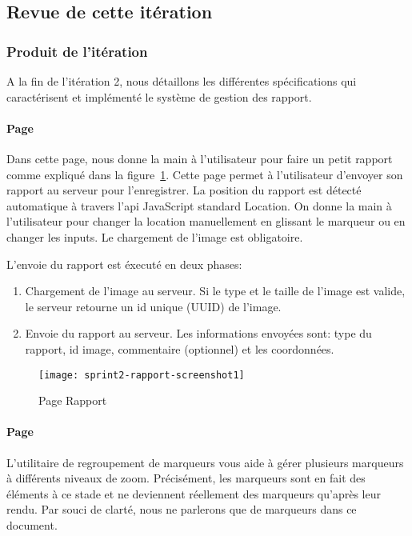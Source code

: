 \subsection{Revue de cette itération}

\subsubsection{Produit de l'itération}

A la fin de l'itération 2, nous détaillons les différentes spécifications qui
caractérisent et implémenté le système de gestion des rapport.

\paragraph{Page }

Dans cette page, nous donne la main à l'utilisateur pour faire un petit rapport
comme expliqué dans la figure~\ref{fig:sprint2-rapport-screenshot1}. Cette page
permet à l'utilisateur d'envoyer son rapport au serveur pour l'enregistrer. La
position du rapport est détecté automatique à travers l'api JavaScript standard
Location. On donne la main à l'utilisateur pour changer la location
manuellement en glissant le marqueur ou en changer les inputs. Le chargement de
l'image est obligatoire.


L'envoie du rapport est éxecuté en deux phases:

\begin{enumerate}
    \item Chargement de l'image au serveur. Si le type et le taille de l'image
        est valide, le serveur retourne un id unique (UUID) de l'image.
    \item Envoie du rapport au serveur. Les informations envoyées sont: type du
        rapport, id image, commentaire (optionnel) et les coordonnées.
\end{enumerate}

\begin{figure}[htbp]
    \centering
    \texttt{[image: sprint2-rapport-screenshot1]}
    \caption{Page Rapport}
    \label{fig:sprint2-rapport-screenshot1}
\end{figure}

\paragraph{Page }
L'utilitaire de regroupement de marqueurs vous aide à gérer plusieurs marqueurs
à différents niveaux de zoom. Précisément, les marqueurs sont en fait des
éléments à ce stade et ne deviennent réellement des marqueurs qu'après leur
rendu. Par souci de clarté, nous ne parlerons que de marqueurs dans ce
document.

